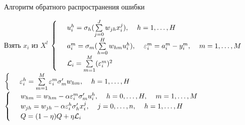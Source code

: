 \documentclass[10pt]{beamer}
\begin{document}
{
\begin{frame}{Алгоритм обратного распространения ошибки}
  \begin{algorithmic}[1]
       \State Взять $x_i$ из $X^l$
       \State 	$\begin{cases}
	\hspace{5mm} u^h_i = \sigma_h (\sum\limits_{j=0}^J w_{jh} x_i^j), \hspace{4mm} h = 1, \dots, H\\
	\hspace{5mm} a^m_i = \sigma_m (\sum\limits_{h=0}^H w_{hm} u_i^h), \hspace{4mm} \varepsilon_i^m = a_i^m - y_i^m, \hspace{4mm} m = 1, \dots, M\\
	\hspace{5mm} \mathcal{L}_i = \sum\limits_{m=1}^M (\varepsilon_i^m)^2\\
	\end{cases}$\\
	$\begin{cases} \hspace{5mm} \varepsilon_i^h = \sum\limits_{m=1}^M \varepsilon_i^m \sigma'_m w_{hm}, \hspace{4mm} h = 1, \dots, H\end{cases}$\\
	$\begin{cases} \hspace{5mm} w_{hm} = w_{hm} - \alpha \varepsilon_i^m \sigma'_m u_i^h, \hspace{4mm} h = 0, \dots, H, \hspace{4mm} m = 1, \dots, M\\
	\hspace{5mm} w_{jh} = w_{jh} - \alpha \varepsilon_i^h \sigma'_h x_i^j, \hspace{4mm} j = 0, \dots, n, \hspace{4mm} h = 1, \dots, H\\
	\hspace{5mm} Q = (1 - \eta)Q + \eta \mathcal{L}_i \end{cases}$
     \EndRepeat
    \EndFunction
  \end{algorithmic}    
\end{frame}
}
\end{document}
